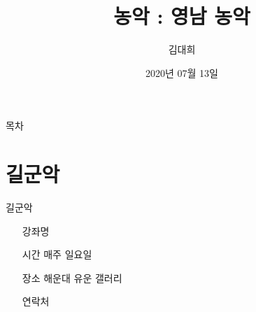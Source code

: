 \documentclass[aspectratio=1610,17pt,xcolor=pdftex,dvipsnames,table,handout]{beamer}
\begin{document}
	

			\title{ 농악  : 영남 농악 }

			\author{김대희}

			\date{2020년 07월 13일}




		\begin{frame}[plain]
		\titlepage
		\end{frame}



		\begin{frame} {목차}
		\tableofcontents
		\end{frame}
		

%
%
%		

		
				
		
		\section{ 길군악 } 
		

		\begin{frame} [t,plain]
			\begin{block} { 길군악 } 

			\setlength{\leftmargini}{5em}			
			\begin{itemize}
				\item [강좌명]  
				\item [시간]  매주 일요일
				\item [장소]  해운대 유운 갤러리
				\item [연락처]  
			\end{itemize}
			
			\end{block}
		\end{frame}
		
\end{document}
